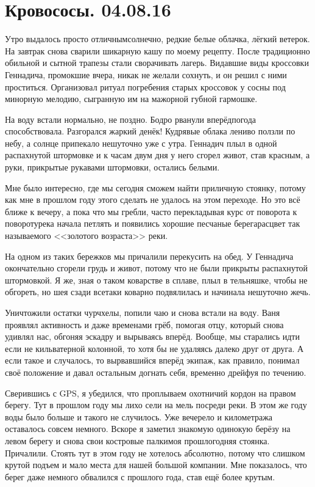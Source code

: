 \chapter{Кровососы. 04.08.16} 

Утро выдалось просто отличным\mdash  солнечно, редкие белые облачка, лёгкий ветерок. На завтрак снова сварили шикарную кашу по моему рецепту. После традиционно обильной и сытной трапезы стали сворачивать лагерь. Видавшие виды кроссовки Геннадича, промокшие вчера, никак не желали сохнуть, и он решил с ними проститься. Организовал ритуал погребения старых кроссовок у сосны под минорную мелодию, сыгранную им на мажорной губной гармошке.

На воду встали нормально, не поздно.  Бодро рванули вперёд\mdash  погода способствовала. Разгорался жаркий денёк! Кудрявые облака лениво ползли по небу, а солнце припекало нешуточно уже с утра. Геннадич плыл в одной распахнутой штормовке и к часам двум дня у него сгорел живот, став красным, а руки, прикрытые рукавами штормовки, остались белыми. 

Мне было интересно, где мы сегодня сможем найти приличную стоянку, потому как мне в прошлом году этого сделать не удалось на этом переходе. Но это всё ближе к вечеру, а пока что мы гребли, часто перекладывая курс от поворота к повороту\mdash  река начала петлять и появились хорошие песчаные берега\mdash  расцвет так называемого <<золотого возраста>> реки.

На одном из таких бережков мы причалили перекусить на обед. У Геннадича окончательно сгорели грудь и живот, потому что не были прикрыты распахнутой штормовкой. Я же, зная о таком коварстве в сплаве, плыл в тельняшке, чтобы не обгореть, но шея сзади все\sdash таки коварно подвялилась и начинала нешуточно жечь.

Уничтожили остатки чурчхелы, попили чаю и снова встали на воду. Ваня проявлял активность и даже временами грёб, помогая отцу, который снова удивлял нас, обгоняя эскадру и вырываясь вперёд. Вообще, мы старались идти если не кильватерной колонной, то хотя бы не удаляясь далеко друг от друга. А если такое и случалось, то вырвавшийся вперёд экипаж, как правило, понимал своё положение и давал остальным догнать себя, временно дрейфуя по течению.

Сверившись с GPS, я убедился, что проплываем охотничий кордон на правом берегу. Тут в прошлом году мы лихо сели на мель посреди реки. В этом же году воды было больше и такого не случилось. Уже вечерело и километража оставалось совсем немного. Вскоре я заметил знакомую одинокую берёзу на левом берегу и снова свои костровые палки\mdash  моя прошлогодняя стоянка. Причалили. Стоять тут в этом году не хотелось абсолютно, потому что слишком крутой подъем и мало места для нашей большой компании. Мне показалось, что берег даже немного обвалился с прошлого года, став ещё более крутым.


